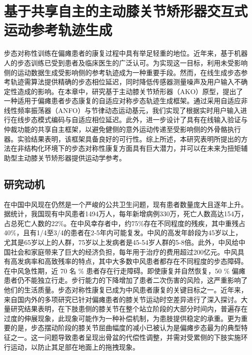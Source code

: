 \chapter{基于共享自主的主动膝关节矫形器交互式运动参考轨迹生成}
步态对称性训练在偏瘫患者的康复过程中具有举足轻重的地位。近年来，基于机器人的步态训练已受到患者及临床医生的广泛认可。为实现这一目标，利用未受影响侧的运动数据生成受影响侧的参考轨迹成为一种重要手段。然而，在线生成步态参考轨迹需算法提供精确的步态相位延迟，同时降低传感器测量噪声及用户输入不确定性造成的影响。在本章中，研究基于主动膝关节矫形器（AKO）原型，提出了一种适用于偏瘫患者步态康复的自适应对称步态轨迹生成框架。通过采用自适应非线性频率振荡器（ANFO）与节律动态运动基元，我们实现了根据实时用户输入进行在线步态模式编码与自适应相位延迟。此外，进一步设计了具有在线输入验证与仲裁功能的共享自主框架，以避免健侧的意外运动传递至受影响侧的外骨骼执行器。实验结果表明，该框架具备良好的可行性。综上所述，本研究表明所提出的方法在非结构化环境下的步态对称性康复方面具有巨大潜力，并可以在未来为扭矩辅助型主动膝关节矫形器提供运动学参考。
\section{研究动机}
在中国中风现在仍然是一个严峻的公共卫生问题，现有患者数量庞大且逐年上升。据统计，我国现有中风患者1494万人，每年新增病例330万，死亡人数高达154万，占总死亡人数的22\%。在中风幸存者中，约75\%存在不同程度的残疾，其中重残占40\%，且有1/4至3/4的患者在2-5年内可能复发。中风的高发年龄段为45岁以上，尤其是65岁以上的人群，75岁以上发病者是45-54岁人群的5-8倍。此外，中风给中国社会和家庭带来了巨大的经济负担，每年用于治疗的费用超过200亿元。中风具有高发病率和高致残率的特点，其中大多数中风患者都存在不同程度的步态障碍。在中风急性期，近 70 名 \% 患者存在行走障碍。即使康复并自然恢复，50 \% 偏瘫患者仍不能独立行走\cite{jorgensenRecoveryWalkingFunction1995}。步行能力的下降增加了患者二次伤害的风险，这严重影响了他们的生活质量\cite{balabanGaitDisturbancesPatients2014,yelnikClinicalGuideAssess1999}。步态对称性康复已成为中风患者康复的关键目标之一。近年来，来自国内外的多项研究已针对偏瘫患者的膝关节运动时空差异进行了深入探讨。大量研究结果表明，在下肢患侧的膝关节在整个站立阶段的大部分时间内，普遍存在过度的伸展现象\cite{woolleyCharacteristicsGaitHemiplegia2015}，此现象可能作为一种补偿机制，为患肢提供稳定的承重。更为重要的是，步态摆动阶段的膝关节屈曲幅度的减小已被认为是偏瘫步态最为的典型特征之一\cite{lucareliALTERATIONLOADRESPONSEMECHANISM2006,campaniniMethodDifferentiateCauses2013}。这一问题导致患者呈现出骨盆的代偿性调整，并需对受累侧的下肢实施环行运动，以防止其足部在地面上的拖拽现象\cite{cruzBiomechanicalImpairmentsGait2009}。



